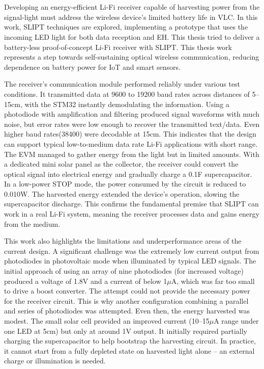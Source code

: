 \chapter{}

Developing an energy-efficient Li-Fi receiver capable of harvesting power from the signal-light must address the wireless device’s limited battery life in \ac{VLC}. In this work, \ac{SLIPT} techniques are explored, implementing a prototype that uses the incoming LED light for both data reception and \ac{EH}. This thesis tried to deliver a battery-less proof-of-concept \ac{Li-Fi} receiver with \ac{SLIPT}. This thesis work represents a step towards self-sustaining optical wireless communication, reducing dependence on battery power for IoT and smart sensors.

The receiver’s communication module performed reliably under various test conditions. It transmitted data at 9600 to 19200 baud rates across distances of 5–15cm, with the STM32 instantly demodulating the information. Using a photodiode with amplification and filtering produced signal waveforms with much noise, but error rates were low enough to recover the transmitted text/data. Even higher baud rates(38400) were decodable at 15cm. This indicates that the design can support typical low-to-medium data rate \ac{Li-Fi} applications with short range. The \ac{EVM} managed to gather energy from the light but in limited amounts. With a dedicated mini solar panel as the collector, the receiver could convert the optical signal into electrical energy and gradually charge a 0.1F supercapacitor. In a low-power STOP mode, the power consumed by the circuit is reduced to 0.010W. The harvested energy extended the device’s operation, slowing the supercapacitor discharge. This confirms the fundamental premise that \ac{SLIPT} can work in a real \ac{Li-Fi} system, meaning the receiver processes data and gains energy from the medium.

This work also highlights the limitations and underperformance areas of the current design. A significant challenge was the extremely low current output from photodiodes in photovoltaic mode when illuminated by typical LED signals. The initial approach of using an array of nine photodiodes (for increased voltage) produced a voltage of 1.8V and a current of below 1\(\mu\)A, which was far too small to drive a boost converter. The attempt could not provide the necessary power for the receiver circuit. This is why another configuration combining a parallel and series of photodiodes was attempted. Even then, the energy harvested was modest. The small solar cell provided an improved current (10–15\(\mu\)A range under one LED at 5cm) but only at around 1V output. It initially required partially charging the supercapacitor to help bootstrap the harvesting circuit. In practice, it cannot start from a fully depleted state on harvested light alone – an external charge or illumination is needed. 

